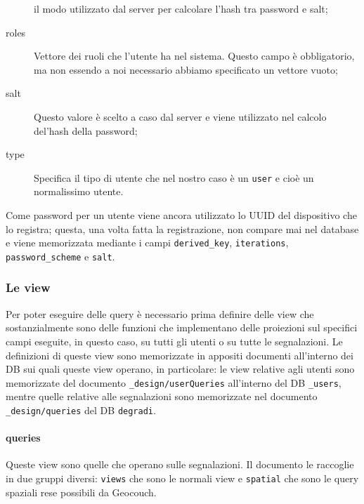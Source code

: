\begin{description}
                    il modo utilizzato dal server per calcolare l'hash tra
                    password e salt;
                    \item[roles] Vettore dei ruoli che l'utente ha nel
                    sistema. Questo campo è obbligatorio, ma non essendo a noi
                    necessario abbiamo specificato un vettore vuoto;
                    \item[salt] Questo valore è scelto a caso dal server e
                    viene utilizzato nel calcolo del'hash della password;
                    \item[type] Specifica il tipo di utente che nel nostro
                    caso è un \texttt{user} e cioè un normalissimo utente.
                \end{description}
                Come password per un utente viene ancora utilizzato lo UUID
                del dispositivo che lo registra; questa, una volta fatta la
                registrazione, non compare mai nel database e viene
                memorizzata mediante i campi \texttt{derived\_key},
                \texttt{iterations}, \texttt{password\_scheme} e \texttt{salt}.

            \subsubsection{Le view}
                Per poter eseguire delle query è necessario prima definire
                delle view che sostanzialmente sono delle funzioni che
                implementano delle proiezioni sul specifici campi eseguite, in
                questo caso, su tutti gli utenti o su tutte le segnalazioni.
                Le definizioni di queste view sono memorizzate in appositi
                documenti all'interno dei DB sui quali queste view operano, in
                particolare: le view relative agli utenti sono memorizzate del
                documento \texttt{\_design/userQueries} all'interno del DB
                \texttt{\_users}, mentre quelle relative alle segnalazioni
                sono memorizzate nel documento \texttt{\_design/queries} del
                DB \texttt{degradi}.

                \paragraph{queries} Queste view sono quelle che operano sulle
                segnalazioni. Il documento le raccoglie in due gruppi diversi:
                \texttt{views} che sono le normali view e \texttt{spatial} che
                sono le query spaziali rese possibili da Geocouch.

